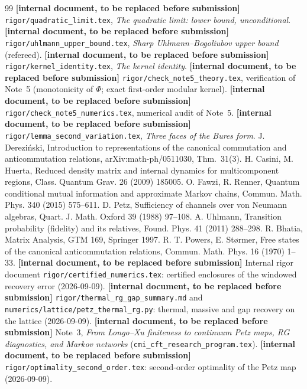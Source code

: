 \documentclass[11pt,a4paper]{article}
\theoremstyle{definition}\newtheorem{definition}[theorem]{Definition}\newtheorem{remark}[theorem]{Remark}
\begin{document}
\begin{thebibliography}{99}
 \textbf{[internal document, to be replaced before submission]} \texttt{rigor/quadratic\_limit.tex}, \emph{The quadratic limit: lower bound, unconditional}.
 \textbf{[internal document, to be replaced before submission]} \texttt{rigor/uhlmann\_upper\_bound.tex}, \emph{Sharp Uhlmann--Bogoliubov upper bound} (refereed).
 \textbf{[internal document, to be replaced before submission]} \texttt{rigor/kernel\_identity.tex}, \emph{The kernel identity}.
 \textbf{[internal document, to be replaced before submission]} \texttt{rigor/check\_note5\_theory.tex}, verification of Note~5 (monotonicity of $\Phi$; exact first-order modular kernel).
 \textbf{[internal document, to be replaced before submission]} \texttt{rigor/check\_note5\_numerics.tex}, numerical audit of Note~5.
 \textbf{[internal document, to be replaced before submission]} \texttt{rigor/lemma\_second\_variation.tex}, \emph{Three faces of the Bures form}.
 J. Derezi\'nski, Introduction to representations of the canonical commutation and anticommutation relations, arXiv:math-ph/0511030, Thm.~31(3).
 H. Casini, M. Huerta, Reduced density matrix and internal dynamics for multicomponent regions, Class. Quantum Grav. 26 (2009) 185005.
 O. Fawzi, R. Renner, Quantum conditional mutual information and approximate Markov chains, Commun. Math. Phys. 340 (2015) 575--611.
 D. Petz, Sufficiency of channels over von Neumann algebras, Quart. J. Math. Oxford 39 (1988) 97--108.
 A. Uhlmann, Transition probability (fidelity) and its relatives, Found. Phys. 41 (2011) 288--298.
 R. Bhatia, Matrix Analysis, GTM 169, Springer 1997.
 R. T. Powers, E. St\o rmer, Free states of the canonical anticommutation relations, Commun. Math. Phys. 16 (1970) 1--33.
 \textbf{[internal document, to be replaced before submission]} Internal rigor document \texttt{rigor/certified\_numerics.tex}: certified enclosures of the windowed recovery error (2026-09-09).
 \textbf{[internal document, to be replaced before submission]} \texttt{rigor/thermal\_rg\_gap\_summary.md} and \texttt{numerics/lattice/petz\_thermal\_rg.py}: thermal, massive and gap recovery on the lattice (2026-09-09).
 \textbf{[internal document, to be replaced before submission]} Note~3, \emph{From Longo--Xu finiteness to continuum Petz maps, RG diagnostics, and Markov networks} (\texttt{cmi\_cft\_research\_program.tex}).
 \textbf{[internal document, to be replaced before submission]} \texttt{rigor/optimality\_second\_order.tex}: second-order optimality of the Petz map (2026-09-09).

\end{thebibliography}
\end{document}

